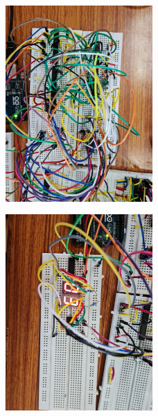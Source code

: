 \documentclass[a4paper,12pt]{article}
\begin{document}
\begin{figure}[H]
  \centering
  \includegraphics[width=0.5\textwidth]{circuit_picture_3.jpeg} %
\end{figure}
\begin{figure}[H]
  \centering
  \includegraphics[width=0.5\textwidth]{circuit_picture_4.jpeg} %
\end{figure}
\end{document}
